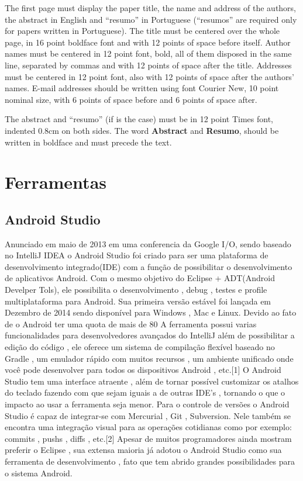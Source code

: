 \documentclass[12pt]{article}
\begin{document}
The first page must display the paper title, the name and address of the
authors, the abstract in English and ``resumo'' in Portuguese (``resumos'' are
required only for papers written in Portuguese). The title must be centered
over the whole page, in 16 point boldface font and with 12 points of space
before itself. Author names must be centered in 12 point font, bold, all of
them disposed in the same line, separated by commas and with 12 points of
space after the title. Addresses must be centered in 12 point font, also with
12 points of space after the authors' names. E-mail addresses should be
written using font Courier New, 10 point nominal size, with 6 points of space
before and 6 points of space after.

The abstract and ``resumo'' (if is the case) must be in 12 point Times font,
indented 0.8cm on both sides. The word \textbf{Abstract} and \textbf{Resumo},
should be written in boldface and must precede the text.

\section{Ferramentas}
\subsection{Android Studio}
	Anunciado em maio de 2013 em uma conferencia da Google I/O, sendo baseado no IntelliJ IDEA o Android Studio foi criado para ser uma plataforma de desenvolvimento integrado(IDE) com a função de possibilitar o desenvolvimento de aplicativos Android. Com o mesmo objetivo do Eclipse + ADT(Android Develper Tols), ele possibilita o desenvolvimento , debug , testes e profile multiplataforma para Android. Sua primeira versão estável foi lançada em Dezembro de 2014 sendo disponível para Windows , Mac e Linux.
	Devido ao fato de o Android ter uma quota de mais de 80%
	A ferramenta possui varias funcionalidades para desenvolvedores avançados do IntelliJ além de possibilitar a edição do código , ele oferece um sistema de compilação flexível baseado no Gradle , um emulador rápido com muitos recursos , um ambiente unificado onde você pode desenvolver para todos os dispositivos Android , etc.[1]
	O Android Studio tem uma interface atraente , além de tornar possível customizar os atalhos do teclado fazendo com que sejam iguais a de outras IDE’s  , tornando o que o impacto ao usar a ferramenta seja menor. 
	Para o controle de versões o Android Studio é capaz de integrar-se com Mercurial , Git , Subversion. Nele também se encontra uma integração visual para as operações cotidianas como por exemplo: commits , pushs , diffs , etc.[2]
	Apesar de muitos programadores ainda mostram preferir o Eclipse , sua extensa maioria já adotou o Android Studio como sua ferramenta de desenvolvimento , fato que tem abrido grandes possibilidades para o sistema Android.
	
\end{document}
